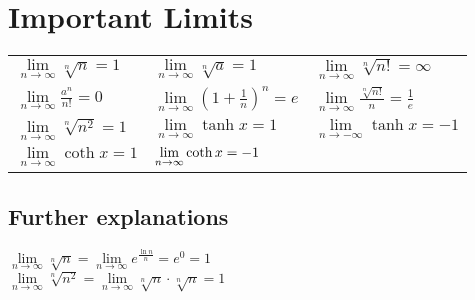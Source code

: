 \section*{Important Limits}

\begin{tabular}{p{.333\linewidth}p{.333\linewidth}p{.333\linewidth}}
    $\lim\limits_{n\to\infty} \sqrt[n]{n} = 1$ &
    $\lim\limits_{n\to\infty} \sqrt[n]{a} = 1$ &
    $\lim\limits_{n\to\infty} \sqrt[n]{n!} = \infty$ \\
    $\lim\limits_{n\to\infty} \frac{a^n}{n!} = 0$ &
    $\lim\limits_{n\to\infty} \left(1+\frac{1}{n}\right)^n = e$ &
    $\lim\limits_{n\to\infty} \frac{\sqrt[n]{n!}}{n} = \frac{1}{e}$ \\
    $\lim\limits_{n\to\infty} \sqrt[n]{n^2} = 1$ &
    $\lim\limits_{n\to\infty} \tanh{x} = 1$ &
    $\lim\limits_{n\to-\infty} \tanh{x} = -1$ \\
    $\lim\limits_{n\to\infty} \coth{x} = 1$ &
    $\lim\limits_{n\to\-\infty} \coth{x} = -1$ \\
\end{tabular}

\subsection*{Further explanations}
$\lim\limits_{n\to\infty} \sqrt[n]{n} = \lim\limits_{n\to\infty} e^{\frac{\ln{n}}{n}} = e^0 = 1$\\
$\lim\limits_{n\to\infty} \sqrt[n]{n^2} = \lim\limits_{n\to\infty} \sqrt[n]{n} \cdot \sqrt[n]{n} = 1$

